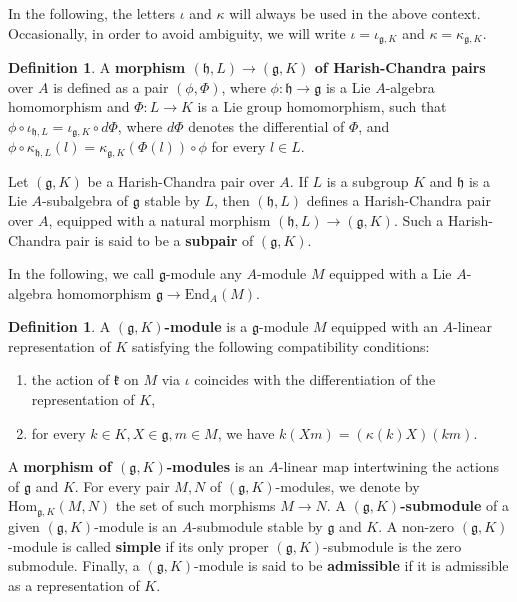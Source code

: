 \documentclass{amsart}
\theoremstyle{definition}
\newtheorem{definition}[theorem]{Definition}
\begin{document}
In the following, the letters $\iota$ and $\kappa$ will always be used in the above context. Occasionally, in order to avoid ambiguity, we will write $\iota = \iota_{\mathfrak{g},K}$ and $\kappa = \kappa_{\mathfrak{g},K}$.

\begin{definition}
    A \textbf{morphism $(\mathfrak{h}, L) \to (\mathfrak{g}, K)$ of Harish-Chandra pairs} over $A$ is defined as a pair $(\phi, \Phi)$, where $\phi : \mathfrak{h} \to \mathfrak{g}$ is a Lie $A$-algebra homomorphism and $\Phi : L \to K$ is a Lie group homomorphism, such that $\phi \circ \iota_{\mathfrak{h}, L} = \iota_{\mathfrak{g}, K}\circ d\Phi$, where $d\Phi$ denotes the differential of $\Phi$, and $\phi \circ\kappa_{\mathfrak{h}, L}(l) = \kappa_{\mathfrak{g}, K}(\Phi(l)) \circ \phi$ for every $l \in L$.
\end{definition}



Let $(\mathfrak{g},K)$ be a Harish-Chandra pair over $A$. If $L$ is a subgroup $K$ and $\mathfrak{h}$ is a Lie $A$-subalgebra of $\mathfrak{g}$ stable by $L$, then $(\mathfrak{h},L)$ defines a Harish-Chandra pair over $A$, equipped with a natural morphism $(\mathfrak{h},L) \to (\mathfrak{g},K)$. Such a Harish-Chandra pair is said to be a \textbf{subpair} of $(\mathfrak{g},K)$.

In the following, we call $\mathfrak{g}$-module any $A$-module $M$ equipped with a Lie $A$-algebra homomorphism $\mathfrak{g} \to \mathrm{End}_A(M)$.

\begin{definition} \label{gKmodule}
     A \textbf{$(\mathfrak{g},K)$-module} is a $\mathfrak{g}$-module $M$ equipped with an $A$-linear representation of $K$ satisfying the following compatibility conditions:
    \begin{enumerate}[label = (\roman*)]
        \item the action of $\mathfrak{k}$ on $M$ via $\iota$ coincides with the differentiation of the representation of $K$,
        \item for every $k \in K, X\in \mathfrak{g}, m\in M$, we have $k(Xm) = (\kappa(k)X)(km)$.
    \end{enumerate}

    A \textbf{morphism of $(\mathfrak{g},K)$-modules} is an $A$-linear map intertwining the actions of $\mathfrak{g}$ and $K$. For every pair $M, N$ of $(\mathfrak{g},K)$-modules, we denote by $\mathrm{Hom}_{\mathfrak{g},K}(M,N)$ the set of such morphisms $M \to N$.
    A $(\mathfrak{g},K)$\textbf{-submodule} of a given $(\mathfrak{g},K)$-module is an $A$-submodule stable by $\mathfrak{g}$ and $K$. A non-zero $(\mathfrak{g},K)$-module is called \textbf{simple} if its only proper $(\mathfrak{g},K)$-submodule is the zero submodule. Finally, a $(\mathfrak{g},K)$-module is said to be \textbf{admissible} if it is admissible as a representation of $K$.
\end{definition}
\end{document}
